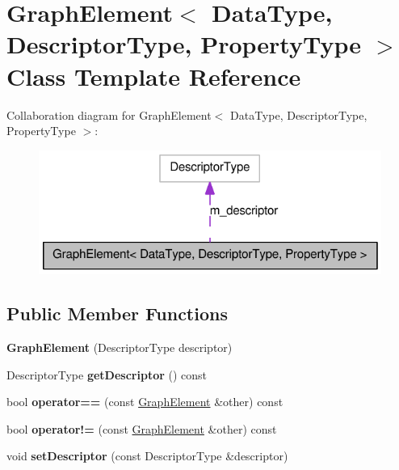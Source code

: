\hypertarget{class_graph_element}{
\section{GraphElement$<$ DataType, DescriptorType, PropertyType $>$ Class Template Reference}
\label{class_graph_element}
}


Collaboration diagram for GraphElement$<$ DataType, DescriptorType, PropertyType $>$:\nopagebreak
\begin{figure}[H]
\begin{center}
\leavevmode
\includegraphics[width=318pt]{class_graph_element__coll__graph}
\end{center}
\end{figure}
\subsection*{Public Member Functions}
\begin{DoxyCompactItemize}
\item 
\hypertarget{class_graph_element_af7990d59939840e20f864927e1926af9}{
{\bfseries GraphElement} (DescriptorType descriptor)}
\label{class_graph_element_af7990d59939840e20f864927e1926af9}

\item 
\hypertarget{class_graph_element_a48e1d03dc9ef41d43233edf525edbe3e}{
DescriptorType {\bfseries getDescriptor} () const }
\label{class_graph_element_a48e1d03dc9ef41d43233edf525edbe3e}

\item 
\hypertarget{class_graph_element_a8648721e1c7e946d3e12fb4603161c08}{
bool {\bfseries operator==} (const \hyperlink{class_graph_element}{GraphElement} \&other) const }
\label{class_graph_element_a8648721e1c7e946d3e12fb4603161c08}

\item 
\hypertarget{class_graph_element_a71d2a6395d12b8b7981408f118cba35a}{
bool {\bfseries operator!=} (const \hyperlink{class_graph_element}{GraphElement} \&other) const }
\label{class_graph_element_a71d2a6395d12b8b7981408f118cba35a}

\item 
\hypertarget{class_graph_element_a8a51312d3dbb1fe4e36f9902e6bf6342}{
void {\bfseries setDescriptor} (const DescriptorType \&descriptor)}
\label{class_graph_element_a8a51312d3dbb1fe4e36f9902e6bf6342}

\end{DoxyCompactItemize}

